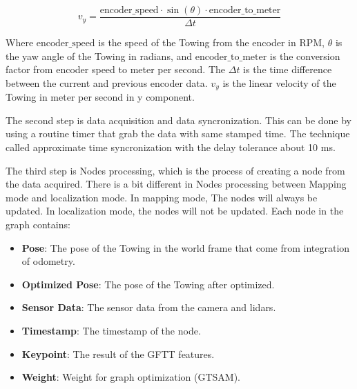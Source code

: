 \documentclass[conference]{IEEEtran}
\begin{document}
\begin{equation}
	v_y = \frac{\text{encoder\_speed} \cdot \sin(\theta) \cdot \text{encoder\_to\_meter}}{\Delta t}
	\label{eq:vy}
\end{equation}

Where \(\text{encoder\_speed}\) is the speed of the Towing from the encoder in RPM, \(\theta\) is the yaw angle of the Towing in radians, and \(\text{encoder\_to\_meter}\) is the conversion factor from encoder speed to meter per second. The \(\Delta t\) is the time difference between the current and previous encoder data. \(v_y\) is the linear velocity of the Towing in meter per second in y component.

\par    
The second step is data acquisition and data syncronization. This can be done by using a routine timer that grab the data with same stamped time. The technique called approximate time syncronization with the delay tolerance about 10 ms. 

\par    
The third step is Nodes processing, which is the process of creating a node from the data acquired. There is a bit different in Nodes processing between Mapping mode and localization mode. In mapping mode, The nodes will always be updated. In localization mode, the nodes will not be updated. Each node in the graph contains: 
\begin{itemize}
	\item \textbf{Pose}: The pose of the Towing in the world frame that come from integration of odometry.
	\item \textbf{Optimized Pose}: The pose of the Towing after optimized.
	\item \textbf{Sensor Data}: The sensor data from the camera and lidars.
	\item \textbf{Timestamp}: The timestamp of the node.
	\item \textbf{Keypoint}: The result of the GFTT features. 
	\item \textbf{Weight}: Weight for graph optimization (GTSAM). 
\end{itemize}
\end{document}
